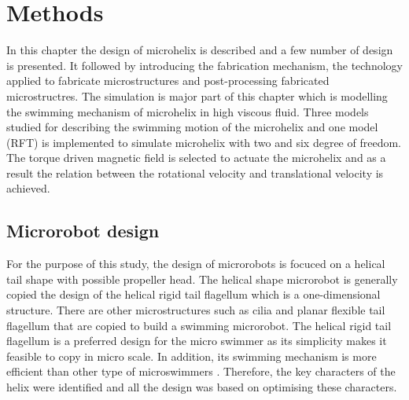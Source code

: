 \documentclass[12pt,a4paper,titlepage]{report}
\begin{document}

\chapter{Methods}

In this chapter the design of microhelix is described and a few number of design is presented. It followed by introducing
the fabrication mechanism, the technology applied to fabricate microstructures and post-processing fabricated microstructres.
The simulation is major part of this chapter which is modelling the swimming mechanism of microhelix in high viscous fluid. 
Three models studied for describing the swimming motion of the microhelix and one model (\ac*{RFT}) is implemented to simulate
microhelix with two and six degree of freedom. The torque driven magnetic field is selected to actuate the microhelix and
as a result the relation between the rotational velocity and translational velocity is achieved.    







\section{Microrobot design} \label{microDesign}

For the purpose of this study, the design of microrobots is focuced on a helical 
tail shape with possible propeller head. The helical shape microrobot is generally copied the design of the helical 
rigid tail flagellum which is a one-dimensional structure. There are other microstructures 
such as cilia and planar flexible tail flagellum that are copied to build a swimming microrobot. The 
helical rigid tail flagellum is a preferred design for the micro swimmer as its simplicity makes
 it feasible to copy in micro scale. In addition, its swimming mechanism is more efficient than 
other type of microswimmers \citep{peyer2013bio}. 
Therefore, the key characters of the helix were 
identified and all the design was based on optimising these characters. 
\end{document}
